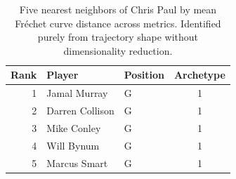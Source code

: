 \begin{table}[htbp]
  \centering\small
  \begin{tabular}{rllc}
    \toprule
    Rank & Player & Position & Archetype \\
    \midrule
    1 & Jamal Murray & G & 1 \\
    2 & Darren Collison & G & 1 \\
    3 & Mike Conley & G & 1 \\
    4 & Will Bynum & G & 1 \\
    5 & Marcus Smart & G & 1 \\
    \bottomrule
  \end{tabular}
  \caption{Five nearest neighbors of Chris Paul by mean Fr\'{e}chet curve distance across metrics. Identified purely from trajectory shape without dimensionality reduction.}
  \label{tab:Chris_Paul_frechet_curve_neighbors}
\end{table}

